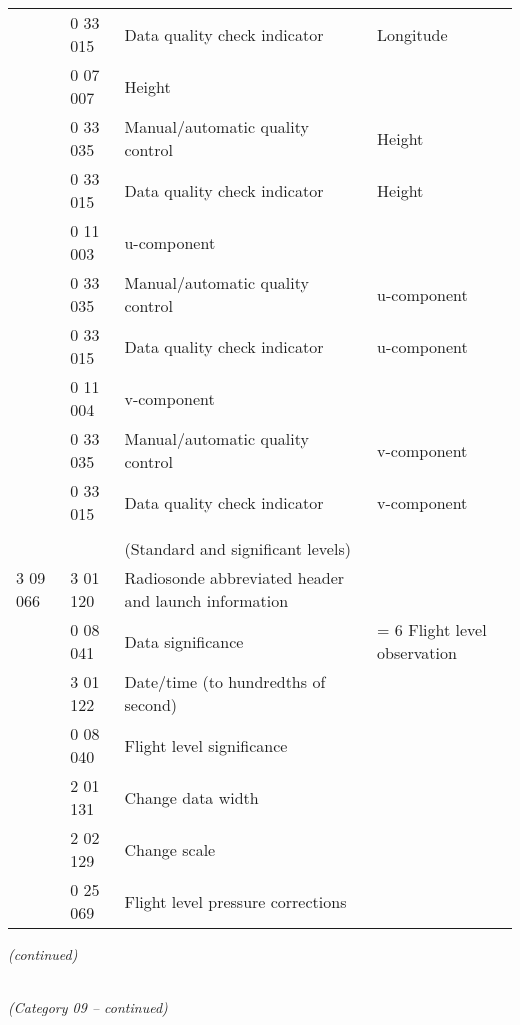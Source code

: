 \begin{longtable}[]{@{}llll@{}}
& 0 33 015 & Data quality check indicator & Longitude\tabularnewline
& 0 07 007 & Height &\tabularnewline
& 0 33 035 & Manual/automatic quality control & Height\tabularnewline
& 0 33 015 & Data quality check indicator & Height\tabularnewline
& 0 11 003 & u-component &\tabularnewline
& 0 33 035 & Manual/automatic quality control & u-component\tabularnewline
& 0 33 015 & Data quality check indicator & u-component\tabularnewline
& 0 11 004 & v-component &\tabularnewline
& 0 33 035 & Manual/automatic quality control & v-component\tabularnewline
& 0 33 015 & Data quality check indicator & v-component\tabularnewline
& & &\tabularnewline
& & (Standard and significant levels) &\tabularnewline
3 09 066 & 3 01 120 & Radiosonde abbreviated header and launch information &\tabularnewline
& 0 08 041 & Data significance & = 6 Flight level observation\tabularnewline
& 3 01 122 & Date/time (to hundredths of second) &\tabularnewline
& 0 08 040 & Flight level significance &\tabularnewline
& 2 01 131 & Change data width &\tabularnewline
& 2 02 129 & Change scale &\tabularnewline
& 0 25 069 & Flight level pressure corrections &\tabularnewline
\bottomrule
\end{longtable}

\emph{(continued)}

\emph{\\
(Category 09 -- continued)}

